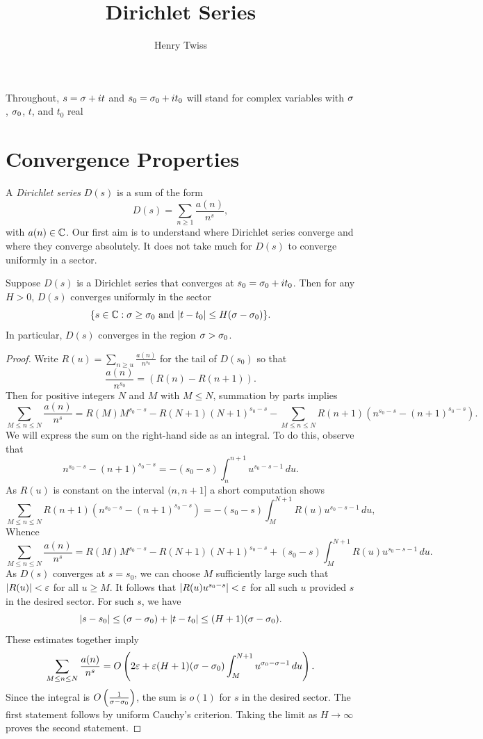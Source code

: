 \documentclass[12pt]{article}
\title{Dirichlet Series}
\author{Henry Twiss}
\begin{document}
  \date{}
  \maketitle
  Throughout, \(s = \sigma+it\) and \(s_{0} = \sigma_{0}+it_{0}\) will stand for complex variables with \(\sigma\), \(\sigma_{0}\), \(t\), and \(t_{0}\) real
  \section{Convergence Properties}
    A \textit{Dirichlet series} \(D(s)\) is a sum of the form
    \[
      D(s) = \sum_{n \ge 1}\frac{a(n)}{n^{s}},
    \]
    with \(a(n) \in \mathbb{C}\). Our first aim is to understand where Dirichlet series converge and where they converge absolutely. It does not take much for \(D(s)\) to converge uniformly in a sector.

    \begin{theorem}\label{thm:convergence_of_Dirichlet_series}
      Suppose \(D(s)\) is a Dirichlet series that converges at \(s_{0} = \sigma_{0}+it_{0}\). Then for any \(H > 0\), \(D(s)\) converges uniformly in the sector
      \[
        \{s \in \mathbb{C}:\sigma \ge \sigma_{0} \text{ and } |t-t_{0}| \le H(\sigma-\sigma_{0})\}.
      \]
      In particular, \(D(s)\) converges in the region \(\sigma > \sigma_{0}\).
    \end{theorem}
    \begin{proof}
      Write \(R(u) = \sum_{n \ge u}\frac{a(n)}{n^{s_{0}}}\) for the tail of \(D(s_{0})\) so that
      \[
        \frac{a(n)}{n^{s_{0}}} = (R(n)-R(n+1)).
      \]
      Then for positive integers \(N\) and \(M\) with \(M \le N\), summation by parts implies
      \[
        \sum_{M \le n \le N}\frac{a(n)}{n^{s}} = R(M)M^{s_{0}-s}-R(N+1)(N+1)^{s_{0}-s}-\sum_{M \le n \le N}R(n+1)(n^{s_{0}-s}-(n+1)^{s_{0}-s}).
      \]
      We will express the sum on the right-hand side as an integral. To do this, observe that
      \[
        n^{s_{0}-s}-(n+1)^{s_{0}-s} = -(s_{0}-s)\int_{n}^{n+1}u^{s_{0}-s-1}\,du.
      \]
      As \(R(u)\) is constant on the interval \((n,n+1]\) a short computation shows
      \[
        \sum_{M \le n \le N}R(n+1)(n^{s_{0}-s}-(n+1)^{s_{0}-s}) = -(s_{0}-s)\int_{M}^{N+1}R(u)u^{s_{0}-s-1}\,du,
      \]
      Whence
      \[
        \sum_{M \le n \le N}\frac{a(n)}{n^{s}} = R(M)M^{s_{0}-s}-R(N+1)(N+1)^{s_{0}-s}+(s_{0}-s)\int_{M}^{N+1}R(u)u^{s_{0}-s-1}\,du.
      \]
      As \(D(s)\) converges at \(s = s_{0}\), we can choose \(M\) sufficiently large such that \(|R(u)| < \varepsilon\) for all \(u \ge M\). It follows that \(|R(u)u^{s_{0}-s}| < \varepsilon\) for all such \(u\) provided \(s\) in the desired sector. For such \(s\), we have
      \[
        |s-s_{0}| \le (\sigma-\sigma_{0})+|t-t_{0}| \le (H+1)(\sigma-\sigma_{0}).
      \]
      These estimates together imply
      \[
        \sum_{M \le n \le N}\frac{a(n)}{n^{s}} = O\left(2\varepsilon+\varepsilon(H+1)(\sigma-\sigma_{0})\int_{M}^{N+1}u^{\sigma_{0}-\sigma-1}\,du\right).
      \]
      Since the integral is \(O\left(\frac{1}{\sigma-\sigma_{0}}\right)\), the sum is \(o(1)\) for \(s\) in the desired sector. The first statement follows by uniform Cauchy's criterion. Taking the limit as \(H \to \infty\) proves the second statement. 
    \end{proof}
    
\end{document}
